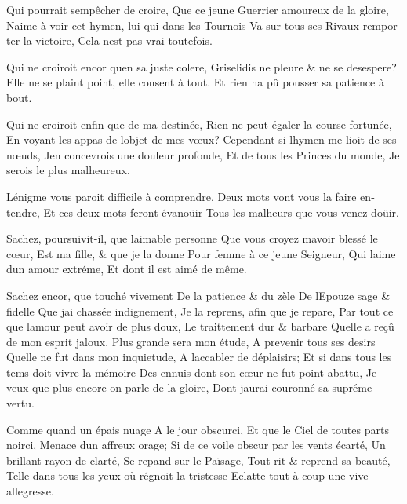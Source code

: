 \documentclass[14pt,a4paper]{memoir}
\begin{document}
\begin{otherlanguage}{french}
{Qui pourrait s\textquotesingle empêcher de croire,} {Que ce jeune
Guerrier amoureux de la gloire,} {N\textquotesingle aime à voir cet
hymen, lui qui dans les Tournois} {Va sur tous ses Rivaux remporter la
victoire,} {Cela n\textquotesingle est pas vrai toutefois.}

{Qui ne croiroit encor qu\textquotesingle en sa juste colere,}
{Griselidis ne pleure \& ne se desespere?} {Elle ne se plaint point,
elle consent à tout.} {Et rien n\textquotesingle a pû pousser sa
patience à bout.}

{Qui ne croiroit enfin que de ma destinée,} {Rien ne peut égaler la
course fortunée,} {En voyant les appas de l\textquotesingle objet de mes
vœux? } {Cependant si l\textquotesingle hymen me lioit de ses nœuds, }
{J\textquotesingle en concevrois une douleur profonde,} {Et de tous les
Princes du monde,} {Je serois le plus malheureux.}

{L\textquotesingle énigme vous paroit difficile à comprendre,} {Deux
mots vont vous la faire entendre,} {Et ces deux mots feront évanoüir}
{Tous les malheurs que vous venez d\textquotesingle oüir.}

{Sachez, poursuivit-il, que l\textquotesingle aimable personne} {Que
vous croyez m\textquotesingle avoir blessé le cœur,} {Est ma fille, \&
que je la donne} {Pour femme à ce jeune Seigneur,} {Qui
l\textquotesingle aime d\textquotesingle un amour extréme,} {Et dont il
est aimé de même.}

{Sachez encor, que touché vivement} {De la patience \& du zèle} {De
l\textquotesingle Epouze sage \& fidelle} {Que j\textquotesingle ai
chassée indignement,} {Je la reprens, afin que je repare,} {Par tout ce
que l\textquotesingle amour peut avoir de plus doux, } {Le traittement
dur \& barbare} {Qu\textquotesingle elle a reçû de mon esprit jaloux.}
{Plus grande sera mon étude,} {A prevenir tous ses desirs}
{Qu\textquotesingle elle ne fut dans mon inquietude,} {A
l\textquotesingle accabler de déplaisirs;} {Et si dans tous les tems
doit vivre la mémoire} {Des ennuis dont son cœur ne fut point abattu,}
{Je veux que plus encore on parle de la gloire,} {Dont
j\textquotesingle aurai couronné sa supréme vertu.}

{Comme quand un épais nuage} {A le jour obscurci,} {Et que le Ciel de
toutes parts noirci,} {Menace d\textquotesingle un affreux orage;} {Si
de ce voile obscur par les vents écarté,} {Un brillant rayon de clarté,}
{Se repand sur le Païsage,} {Tout rit \& reprend sa beauté,} {Telle dans
tous les yeux où régnoit la tristesse } {Eclatte tout à coup une vive
allegresse.}


\end{otherlanguage}
\end{document}
